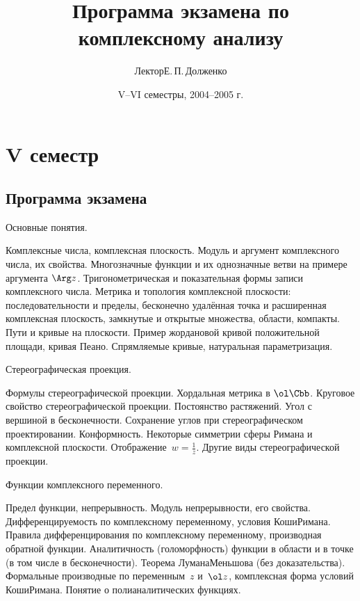 \documentclass[a4paper]{article}
\title{Программа экзамена по комплексному анализу}
\author{Лектор\т Е.\,П.\,Долженко}
\date{V--VI семестры, 2004--2005 г.}
\begin{document}
\maketitle

\section*{V семестр}

\subsection*{Программа экзамена}

\begin{nums}{-2}
\item Основные понятия.

Комплексные числа, комплексная плоскость. Модуль и аргумент комплексного числа,
их свойства. Многозначные функции и их однозначные ветви на примере аргумента $\Arg z$.
Тригонометрическая и показательная формы записи комплексного числа. Метрика и топология комплексной плоскости:
последовательности и пределы, бесконечно удалённая точка и расширенная комплексная плоскость,
замкнутые и открытые множества, области, компакты. Пути и кривые на плоскости. Пример жордановой кривой
положительной площади, кривая Пеано. Спрямляемые кривые, натуральная параметризация.

\item Стереографическая проекция.

Формулы стереографической проекции. Хордальная метрика в $\ol \Cbb$.
Круговое свойство стереографической проекции. Постоянство растяжений. Угол с вершиной в бесконечности.
Сохранение углов при стереографическом проектировании. Конформность. Некоторые симметрии сферы Римана и
комплексной плоскости. Отображение~${w = \frac1z}$. Другие виды стереографической проекции.

\item Функции комплексного переменного.

Предел функции, непрерывность. Модуль
непрерывности, его свойства. Дифференцируемость по комплексному переменному, условия Коши\ч Римана. Правила
дифференцирования по комплексному переменному, производная обратной функции. Аналитичность (голоморфность)
функции в области и в точке (в том числе в бесконечности). Теорема Лумана\ч Меньшова (без доказательства).
Формальные производные по переменным~$z$ и~$\ol z$, комплексная форма условий Коши\ч Римана. Понятие
о полианалитических функциях.


\end{nums}
\end{document}
